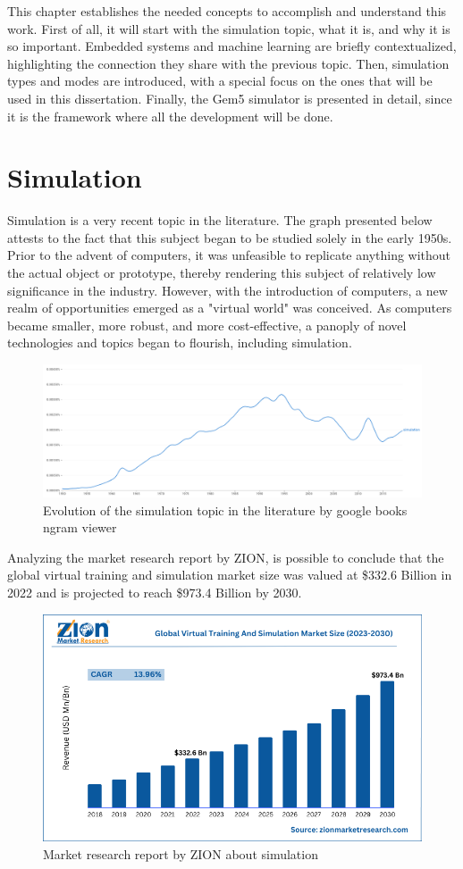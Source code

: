 
This chapter establishes the needed concepts to accomplish and understand this work. First of all, it will start with the simulation topic, what it is, and why it is so important. Embedded systems and machine learning are briefly contextualized, highlighting the connection they share with the previous topic. Then, simulation types and modes are introduced, with a special focus on the ones that will be used in this dissertation. Finally, the Gem5 simulator is presented in detail, since it is the framework where all the development will be done.


\section{Simulation}

Simulation is a very recent topic in the literature. The graph presented below attests to the fact that this subject began to be studied solely in the early 1950s. Prior to the advent of computers, it was unfeasible to replicate anything without the actual object or prototype, thereby rendering this subject of relatively low significance in the industry. However, with the introduction of computers, a new realm of opportunities emerged as a "virtual world" was conceived. As computers became smaller, more robust, and more cost-effective, a panoply of novel technologies and topics began to flourish, including simulation. 

\begin{figure}[H]
	\centering
 	\includegraphics[width=0.7\linewidth]{Images/simulation_evolution_graph.png}
 	\caption{Evolution of the simulation topic in the literature by google books ngram viewer}
	 \label{fig_simulation_evolution_graph}
\end{figure}

Analyzing the market research report by ZION, is possible to conclude that the global virtual training and simulation market size was valued at \$332.6 Billion in 2022 and is projected to reach \$973.4 Billion by 2030.  

\begin{figure}[H]
	\centering
 	\includegraphics[width=0.7\linewidth]{Images/ZION_MarketResearch.png}
 	\caption{Market research report by ZION about simulation \cite{zionMarketResearch}}
	 \label{fig_ZION_MarketResearch}
\end{figure}

